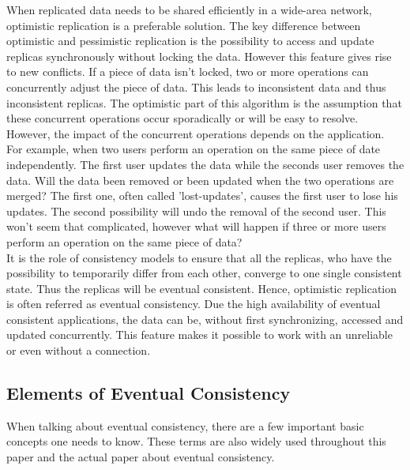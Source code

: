 \documentclass[a4paper,12pt]{report}
\begin{document}
When replicated data needs to be shared efficiently in a wide-area network, optimistic replication is a preferable solution. The key difference between optimistic and pessimistic replication is the possibility to access and update replicas synchronously without locking the data. However this feature gives rise to new conflicts. If a piece of data isn't locked, two or more operations can concurrently adjust the piece of data. This leads to inconsistent data and thus inconsistent replicas. The optimistic part of this algorithm is the assumption that these concurrent operations occur sporadically or will be easy to resolve. However, the impact of the concurrent operations depends on the application. \\
\indent For example, when two users perform an operation on the same piece of date independently. The first user updates the data while the seconds user removes the data. Will the data been removed or been updated when the two operations are merged? The first one, often called 'lost-updates', causes the first user to lose his updates. The second possibility will undo the removal of the second user. This won't seem that complicated, however what will happen if three or more users perform an operation on the same piece of data? \\
It is the role of consistency models to ensure that all the replicas, who have the possibility to temporarily differ from each other, converge to one single consistent state. Thus the replicas will be eventual consistent. Hence, optimistic replication is often referred as eventual consistency. Due the high availability of eventual consistent applications, the data can be, without first synchronizing, accessed and updated concurrently. This feature makes it possible to work with an unreliable or even without a connection. \\

\subsection{Elements of Eventual Consistency}\label{sec:Elements}

When talking about eventual consistency, there are a few important basic concepts one needs to know. These terms are also widely used throughout this paper and the actual paper about eventual consistency. 
\newline
\end{document}
